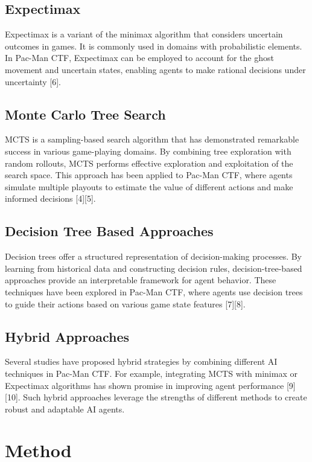 \documentclass[a4paper,12pt]{article}
\begin{document}
\subsection{Expectimax}
\label{subsec:expectimax}
Expectimax is a variant of the minimax algorithm that considers uncertain outcomes in games. It is commonly used in domains with probabilistic elements. In Pac-Man CTF, Expectimax can be employed to account for the ghost movement and uncertain states, enabling agents to make rational decisions under uncertainty [6].

\subsection{Monte Carlo Tree Search}
\label{subsec:mcts}
MCTS is a sampling-based search algorithm that has demonstrated remarkable success in various game-playing domains. By combining tree exploration with random rollouts, MCTS performs effective exploration and exploitation of the search space. This approach has been applied to Pac-Man CTF, where agents simulate multiple playouts to estimate the value of different actions and make informed decisions [4][5].


\subsection{Decision Tree Based Approaches}
\label{subsec:decision_tree}
Decision trees offer a structured representation of decision-making processes. By learning from historical data and constructing decision rules, decision-tree-based approaches provide an interpretable framework for agent behavior. These techniques have been explored in Pac-Man CTF, where agents use decision trees to guide their actions based on various game state features [7][8].

\subsection{Hybrid Approaches}
\label{subsec:hybrid}
Several studies have proposed hybrid strategies by combining different AI techniques in Pac-Man CTF. For example, integrating MCTS with minimax or Expectimax algorithms has shown promise in improving agent performance [9][10]. Such hybrid approaches leverage the strengths of different methods to create robust and adaptable AI agents.



\section{Method}
\label{method}
\end{document}
